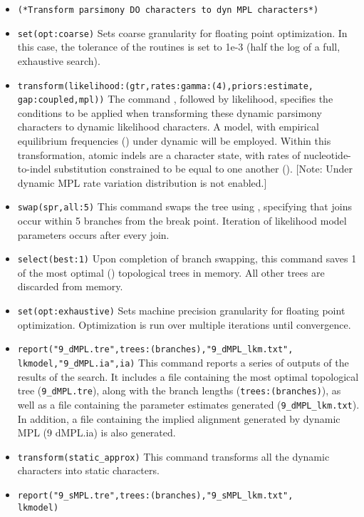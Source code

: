 \begin{itemize}
\item \texttt{(*Transform parsimony DO characters to dyn MPL
characters*)} 
\item \texttt{set(opt:coarse)} Sets coarse granularity
for floating point optimization. In this case, the tolerance of the
routines is set to 1e-3 (half the log of a full, exhaustive search).
\item \texttt{transform(likelihood:(gtr,rates:gamma:(4),priors:estimate,\\gap:coupled,mpl))}
The command , followed by \poyargument
{likelihood}, specifies the conditions to be applied when transforming
these dynamic parsimony characters to dynamic likelihood characters.
A  model, with empirical equilibrium frequencies
() under dynamic 
will be employed. Within this transformation, atomic indels are a
character state, with rates of nucleotide-to-indel substitution
constrained to be equal to one another ().
[Note: Under dynamic MPL rate variation distribution is not enabled.]
\item \texttt{swap(spr,all:5)} This command swaps the tree using
, specifying that joins occur within 5 branches
from the break point. Iteration of likelihood model parameters
occurs after every join.  
\item \texttt{select(best:1)} Upon completion of branch swapping, 
this command saves 1 of the most optimal () 
topological trees in memory. All other trees are discarded from memory.  
\item \texttt{set(opt:exhaustive)} Sets machine precision granularity 
for floating point optimization. Optimization is run over multiple 
iterations until convergence.
\item \texttt{report("9\_dMPL.tre",trees:(branches),"9\_dMPL\_lkm.txt",\\lkmodel,"9\_dMPL.ia",ia)}
This command reports a series of outputs of the results of the
search.  It includes a file containing the most optimal topological
tree (\texttt{9\_dMPL.tre}), along with the branch lengths
(\texttt{trees:(branches)}), as well as a file containing the
parameter estimates generated (\texttt{9\_dMPL\_lkm.txt}).  In
addition, a file containing the implied alignment generated by
dynamic MPL (9 dMPL.ia) is also generated.  
\item \texttt{transform(static\_approx)} This command transforms all the
dynamic characters into static characters.  
\item \texttt{report("9\_sMPL.tre",trees:(branches),"9\_sMPL\_lkm.txt",\\lkmodel)}

\end{itemize}
